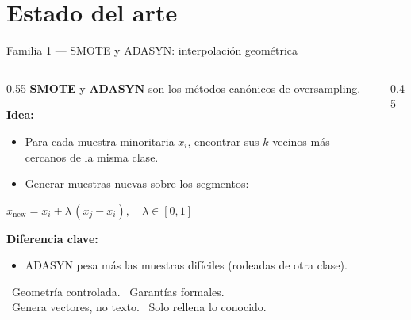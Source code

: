 
\section{Estado del arte}

\begin{frame}{Familia 1 — SMOTE y ADASYN: interpolación geométrica}
\begin{columns}[T]

\begin{column}{0.55\textwidth}
\small
\textbf{SMOTE}  y \textbf{ADASYN}  son los métodos canónicos de oversampling.

\vspace{0.4em}
\textbf{Idea:}
\begin{itemize}\setlength\itemsep{2pt}
  \item Para cada muestra minoritaria $x_i$, encontrar sus $k$ vecinos más cercanos de la misma clase.
  \item Generar muestras nuevas sobre los segmentos:
\end{itemize}

\vspace{0.2em}
\centering
$x_{\text{new}} = x_i + \lambda \,(x_j - x_i), \quad \lambda \in [0,1]$
\raggedright

\vspace{0.5em}
\textbf{Diferencia clave:}
\begin{itemize}\setlength\itemsep{2pt}
  \item ADASYN \alert{pesa más} las muestras difíciles (rodeadas de otra clase).
\end{itemize}

\vspace{0.4em}
\good\ Geometría controlada. \quad \good\ Garantías formales.\\
\bad\ Genera \alert{vectores}, no texto. \quad \bad\ Solo rellena lo conocido.
\end{column}

\begin{column}{0.45\textwidth}
\centering
\vspace{0.3em}
\end{column}
\end{columns}
\end{frame}
